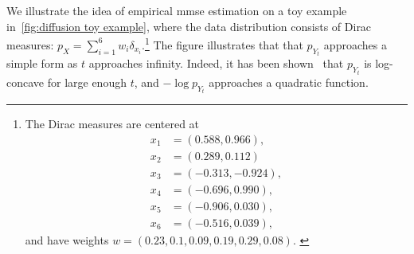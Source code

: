 We illustrate the idea of empirical \gls{mmse} estimation on a toy example in~\cref{fig:diffusion toy example}, where the data distribution consists of Dirac measures: \( p_X = \sum_{i=\num{1}}^6 w_i \delta_{x_i} \).\footnote{%
	The Dirac measures are centered at
	\begin{equation*}
		\begin{aligned}
			x_{\num{1}} &= (\num{0.588},  \num{0.966}), \\
			x_{\num{2}} &= (\num{0.289},  \num{0.112}) \\
			x_{\num{3}} &= (\num{-0.313}, \num{-0.924}), \\
			x_{\num{4}} &= (\num{-0.696}, \num{0.990}), \\
			x_{\num{5}} &= (\num{-0.906}, \num{0.030}), \\
			x_{\num{6}} &= (\num{-0.516}, \num{0.039}),
		\end{aligned}
	\end{equation*}
	and have weights \( w = (\num{0.23}, \num{0.1}, \num{0.09}, \num{0.19}, \num{0.29}, \num{0.08}) \).%
	\label{foot:diract measures}
}
The figure illustrates that that \( p_{Y_t} \) approaches a simple form as \( t \) approaches infinity.
Indeed, it has been shown~\cite{kobler2023learning} that \( p_{Y_t} \) is log-concave for large enough \( t \), and \( -\log p_{Y_t} \) approaches a quadratic function.

